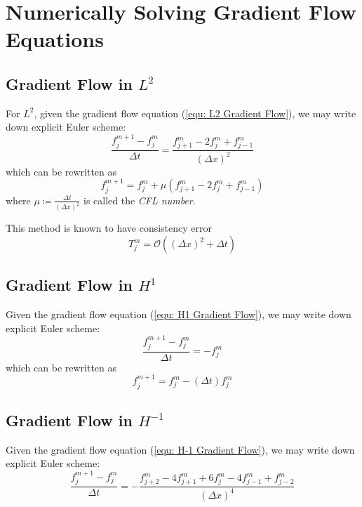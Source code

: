 \documentclass[a4paper]{article}
\theoremstyle{definition}
\begin{document}
\section{Numerically Solving Gradient Flow Equations}
\subsection{Gradient Flow in $L^2$}
For $L^2$, given the gradient flow equation (\ref{equ: L2 Gradient Flow}),
we may write down explicit Euler scheme:
\begin{equation}
    \frac{f_j^{m+1} - f_j^m}{\Delta t} = \frac{f_{j+1}^m - 2 f_{j}^m + f_{j-1}^m}{(\Delta x)^2}
    \label{equ: L2 Numeric}
\end{equation}
which can be rewritten as
\begin{equation}
    f_{j}^{m+1} = f_j^m + \mu \left( f_{j+1}^m - 2 f_{j}^m + f_{j-1}^m \right)
\end{equation}
where $\mu \coloneqq \frac{\Delta t}{(\Delta x)^2}$ is called the \emph{CFL number}.

This method is known to have consistency error
\begin{equation}
    T_j^m = \mathcal{O}\left( \left( \Delta x \right)^2 + \Delta t \right)
    \label{L2 Consistency Error}
\end{equation}

\subsection{Gradient Flow in $H^1$}
Given the gradient flow equation (\ref{equ: H1 Gradient Flow}),
we may write down explicit Euler scheme:
\begin{equation}
    \frac{f_j^{m+1} - f_j^m}{\Delta t} = -f_{j}^m
    \label{equ: H1 Numeric}
\end{equation}
which can be rewritten as
\begin{equation}
    f_j^{m+1} = f_j^m - (\Delta t)f_j^m
\end{equation}

\subsection{Gradient Flow in $H^{-1}$}
Given the gradient flow equation (\ref{equ: H-1 Gradient Flow}),
we may write down explicit Euler scheme:
\begin{equation}
    \frac{f_j^{m+1} - f_j^m}{\Delta t} = -\frac{f_{j+2}^m - 4 f_{j+1}^m + 6 f_j^m - 4 f_{j-1}^m + f_{j-2}^m}{(\Delta x)^4}
    \label{equ: H-1 Numeric}
\end{equation}
\end{document}
